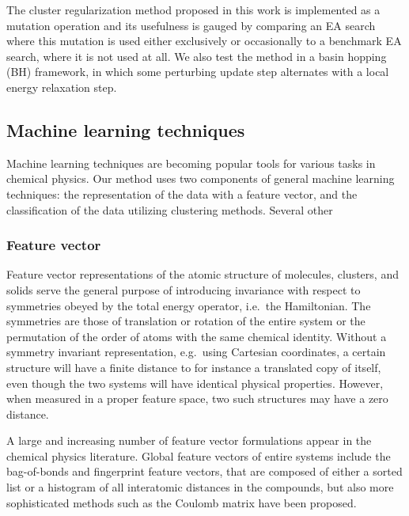 \documentclass[aip,amsmath,amssymb,reprint]{revtex4-1}
\begin{document}
The cluster regularization method proposed in this work is implemented
as a mutation operation and its usefulness is gauged by comparing an
EA search where this mutation is used either exclusively or
occasionally to a benchmark EA search, where it is not used at all. We
also test the method in a basin hopping (BH) framework,\cite{wales1997} in which some
perturbing update step alternates with a local energy relaxation step.

\subsection{Machine learning techniques}
Machine learning techniques are becoming popular tools for various tasks in chemical physics.\cite{Rupp2012,Bartok2013,Hansen2013,Li2015,Botu2015,Khorshidi2016,Alexandrova2016,Schutt2017,Parkhill2017,Patra2017} Our method uses two components of general machine learning techniques:
the representation of the data with a feature vector, and the
classification of the data utilizing clustering methods. Several other 

\subsubsection{Feature vector}
Feature vector representations of the atomic structure of molecules,
clusters, and solids serve the general purpose of introducing
invariance with respect to symmetries obeyed by the total energy
operator, i.e.\ the Hamiltonian.\cite{Bartok2013} The symmetries are those of translation
or rotation of the entire system or the permutation of the order of
atoms with the same chemical identity. Without a symmetry invariant
representation, e.g.\ using Cartesian coordinates, a certain structure
will have a finite distance to for instance a translated copy of
itself, even though the two systems will have identical physical
properties. However, when measured in a proper feature space, two such
structures may have a zero distance.

A large and increasing number of feature vector formulations appear in
the chemical physics literature. Global feature vectors of entire
systems include the bag-of-bonds\cite{bag_of_bonds} and fingerprint\cite{finger_print,finger_print_application} feature
vectors, that are composed of either a sorted list or a histogram of
all interatomic distances in the compounds, but also more
sophisticated methods such as the Coulomb matrix\cite{coulomb_matrix1,coulomb_matrix2} have been
proposed.
\end{document}
